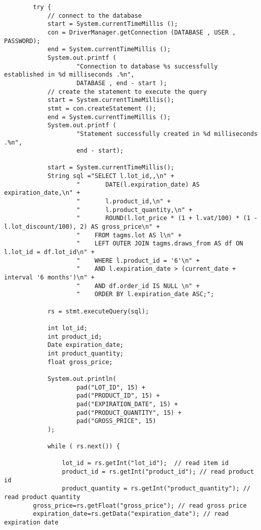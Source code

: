 \begin{lstlisting}
        try {
            // connect to the database
            start = System.currentTimeMillis ();
            con = DriverManager.getConnection (DATABASE , USER , PASSWORD);
            end = System.currentTimeMillis ();
            System.out.printf (
                    "Connection to database %s successfully established in %d milliseconds .%n",
                    DATABASE , end - start );
            // create the statement to execute the query
            start = System.currentTimeMillis();
            stmt = con.createStatement ();
            end = System.currentTimeMillis ();
            System.out.printf (
                    "Statement successfully created in %d milliseconds .%n",
                    end - start);

            start = System.currentTimeMillis();
            String sql ="SELECT l.lot_id,,\n" +
                    "       DATE(l.expiration_date) AS expiration_date,\n" +
                    "       l.product_id,\n" +
                    "       l.product_quantity,\n" +
                    "       ROUND(l.lot_price * (1 + l.vat/100) * (1 - l.lot_discount/100), 2) AS gross_price\n" +
                    "    FROM tagms.lot AS l\n" +
                    "    LEFT OUTER JOIN tagms.draws_from AS df ON l.lot_id = df.lot_id\n" +
                    "    WHERE l.product_id = '6'\n" +
                    "    AND l.expiration_date > (current_date + interval '6 months')\n" +
                    "    AND df.order_id IS NULL \n" +
                    "    ORDER BY l.expiration_date ASC;";

            rs = stmt.executeQuery(sql);

            int lot_id;
            int product_id;
            Date expiration_date;
            int product_quantity;
            float gross_price;

            System.out.println(
                    pad("LOT_ID", 15) +
                    pad("PRODUCT_ID", 15) +
                    pad("EXPIRATION_DATE", 15) +
                    pad("PRODUCT_QUANTITY", 15) +
                    pad("GROSS_PRICE", 15)
            );

            while ( rs.next()) {

                lot_id = rs.getInt("lot_id");  // read item id
                product_id = rs.getInt("product_id"); // read product id
                product_quantity = rs.getInt("product_quantity"); // read product quantity
		gross_price=rs.getFloat("gross_price"); // read gross price
		expiration_date=rs.getData("expiration_date"); // read expiration date


\end{lstlisting}
